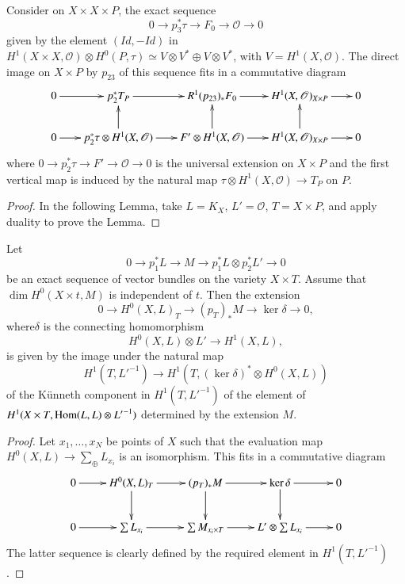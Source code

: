 \setcounter{theorem}{12}
\begin{lemma}\label{art05-lem6.13}
Consider on $X\times X\times P$, the exact sequence
$$
0\to p^{*}_{3}\tau \to F_{0}\to \mathscr{O}\to 0
$$
given by the element $(Id,-Id)$ in $H^{1}(X\times
X,\mathscr{O})\otimes H^{0}(P,\tau)\simeq V\otimes V^{*}\oplus
V\otimes V^{*}$, with $V=H^{1}(X,\mathscr{O})$. The direct image on
$X\times P$ by $p_{23}$ of this sequence fits in a commutative diagram
{\fontsize{10pt}{11pt}\selectfont
\[
\xymatrix@C=.65cm@R=.7cm{
0\ar[r] & p^{*}_{2}T_{P}\ar[r] & R^{1}(p_{23})_{*}F_{0}\ar[r] &
H^{1}(X,\mathscr{O})_{X\times P}\ar[r] & 0\\
0\ar[r] & p^{*}_{2}\tau\otimes H^{1}(X,\mathscr{O})\ar[r]\ar[u] &
F'\otimes H^{1}(X,\mathscr{O})\ar[r]\ar[u] & H^{1}(X,\mathscr{O})_{X\times
P}\ar[r]\ar[u] & 0
}
\]}
where $0\to p^{*}_{2}\tau\to F'\to \mathscr{O}\to 0$ is the universal
extension on $X\times P$ and the first vertical map is induced by the
natural map $\tau\otimes H^{1}(X,\mathscr{O})\to T_{P}$ on $P$.
\end{lemma}

\begin{proof}
In the following Lemma, take $L=K_{X}$, $L'=\mathscr{O}$, $T=X\times
P$, and apply duality to prove the Lemma.
\end{proof}

\begin{lemma}\label{art05-lem6.14}
Let
$$
0\to p^{*}_{1}L\to M\to p^{*}_{1}L\otimes p^{*}_{2}L'\to 0
$$
be an exact sequence of vector bundles on the variety $X\times
T$. Assume that $\dim H^{0}(X\times t,M)$ is independent of $t$. Then
the extension
$$
0\to H^{0}(X,L)_{T}\to (p_{T})_{*}M\to \ker\delta\to 0,
$$
where\pageoriginale $\delta$ is the connecting homomorphism
$$
H^{0}(X,L)\otimes L'\to H^{1}(X,L),
$$ 
is given by the image under the
natural map 
$$
H^{1}(T,{L'}^{-1})\to H^{1}(T,(\ker \delta)^{*}\otimes
H^{0}(X,L))
$$ 
of the K\"unneth component in $H^{1}(T,{L'}^{-1})$ of the
element of $H^{1}(X\times T,\operatorname{Hom}(L,L)\otimes {L'}^{-1})$ determined by
the extension $M$.
\end{lemma}

\begin{proof}
Let $x_{1},\ldots,x_{N}$ be points of $X$ such that the evaluation map
$H^{0}(X,L)\to \sum\limits_{\oplus}L_{x_{i}}$ is an isomorphism. This 
fits in a commutative diagram
\[
\xymatrix{
0\ar[r] & H^{0}(X,L)_{T}\ar[d]\ar[r] & (p_{T})_{*}M\ar[d]\ar[r]
& \ker\delta\ar[d]\ar[r] & 0\\
0\ar[r] & \sum L_{x_{i}}\ar[r] & \sum M_{x_{i}\times T}\ar[r] &
L'\otimes \sum L_{x_{i}}\ar[r] & 0
}
\]
The latter sequence is clearly defined by the required element in
$H^{1}(T,{L'}^{-1})$. 
\end{proof}

